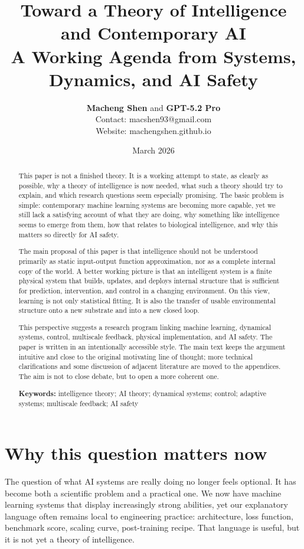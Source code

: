 \documentclass[11pt]{article}
\title{Toward a Theory of Intelligence and Contemporary AI\\\large A Working Agenda from Systems, Dynamics, and AI Safety}
\author{\textbf{Macheng Shen} and \textbf{GPT-5.2 Pro}\\Contact: macshen93@gmail.com\\Website: machengshen.github.io}
\date{March 2026}
\begin{document}
\maketitle

\begin{abstract}


This paper is not a finished theory. It is a working attempt to state, as clearly as possible, why a theory of intelligence is now needed, what such a theory should try to explain, and which research questions seem especially promising. The basic problem is simple: contemporary machine learning systems are becoming more capable, yet we still lack a satisfying account of what they are doing, why something like intelligence seems to emerge from them, how that relates to biological intelligence, and why this matters so directly for AI safety.

The main proposal of this paper is that intelligence should not be understood primarily as static input-output function approximation, nor as a complete internal copy of the world. A better working picture is that an intelligent system is a finite physical system that builds, updates, and deploys internal structure that is sufficient for prediction, intervention, and control in a changing environment. On this view, learning is not only statistical fitting. It is also the transfer of usable environmental structure onto a new substrate and into a new closed loop.

This perspective suggests a research program linking machine learning, dynamical systems, control, multiscale feedback, physical implementation, and AI safety. The paper is written in an intentionally accessible style. The main text keeps the argument intuitive and close to the original motivating line of thought; more technical clarifications and some discussion of adjacent literature are moved to the appendices. The aim is not to close debate, but to open a more coherent one.

\textbf{Keywords:} intelligence theory; AI theory; dynamical systems; control; adaptive systems; multiscale feedback; AI safety

\end{abstract}

\section{Why this question matters now}


The question of what AI systems are really doing no longer feels optional. It has become both a scientific problem and a practical one. We now have machine learning systems that display increasingly strong abilities, yet our explanatory language often remains local to engineering practice: architecture, loss function, benchmark score, scaling curve, post-training recipe. That language is useful, but it is not yet a theory of intelligence.
\end{document}
